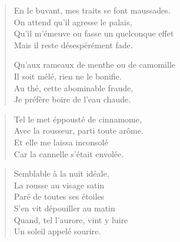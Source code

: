 {{
  }
}

\null
\newpage


\begin{verse}
  \quatrain%
  En le buvant, mes traits se font maussades.\\  %
  On attend qu’il agresse le palais,\\  %
  Qu’il m’émeuve ou fasse un quelconque effet\\  %
  Mais il reste désespérément fade.

  Qu’aux rameaux de menthe ou de camomille\\  %
  Il soit mêlé, rien ne le bonifie.\\  %
  Au thé, cette abominable fraude,\\  %
  Je préfère  boire de l’eau chaude.
\end{verse}


\begin{verse}%
  \quatrain%
  Tel le met éppousté de cinnamome,\\
  Avec la rousseur, parti toute arôme.\\
  Et elle me laissa inconsolé\\
  Car la cannelle s’était envolée.\\
\end{verse}

\begin{verse}%
  \sizain%
  Semblable à la nuit idéale,\\  %
  La rousse au visage satin\\  %
  Paré de toutes ses étoiles\\  %
  S’en vit dépouiller au matin\\  %
  Quand, tel l’aurore, vint y luire\\  %
  Un soleil appelé sourire.
\end{verse}

